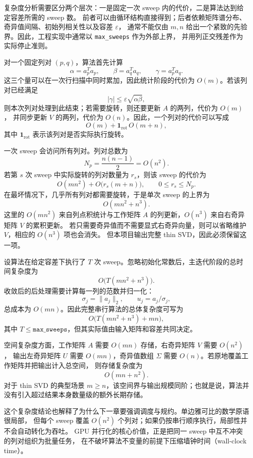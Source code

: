 复杂度分析需要区分两个层次：一是固定一次 sweep 内的代价，二是算法达到给定容差所需的 sweep 数。
前者可以由循环结构直接得到；后者依赖矩阵谱分布、奇异值间隔、初始列相关性以及容差 $\varepsilon$，
通常不能仅由 $m,n$ 给出一个紧致的先验界。因此，工程实现中通常以 \texttt{max\_sweeps} 作为外部上界，
并用列正交残差作为实际停止准则。

对一个固定列对 $(p,q)$，算法首先计算
\[
    \alpha=a_p^Ta_p,\qquad
    \beta=a_q^Ta_q,\qquad
    \gamma=a_p^Ta_q.
\]
这三个量可以在一次行扫描中同时累加，因此统计阶段的代价为 $O(m)$。若该列对已经满足
\[
    |\gamma|\le \varepsilon\sqrt{\alpha\beta},
\]
则本次列对处理到此结束；若需要旋转，则还要更新 $A$ 的两列，代价为 $O(m)$，
并同步更新 $V$ 的两列，代价为 $O(n)$。因此，一个列对的代价可以写成
\[
    O(m) + \mathbf{1}_{\mathrm{rot}}\,O(m+n),
\]
其中 $\mathbf{1}_{\mathrm{rot}}$ 表示该列对是否实际执行旋转。

一次 sweep 会访问所有列对。列对总数为
\[
    N_p=\frac{n(n-1)}{2}=O(n^2).
\]
若第 $s$ 次 sweep 中实际旋转的列对数量为 $r_s$，则该 sweep 的代价为
\[
    O(mn^2)+O\bigl(r_s(m+n)\bigr),
    \qquad 0\le r_s\le N_p.
\]
在最坏情况下，几乎所有列对都需要旋转，于是单次 sweep 的上界为
\[
    O(mn^2+n^3).
\]
这里的 $O(mn^2)$ 来自列点积统计与工作矩阵 $A$ 的列更新，$O(n^3)$ 来自右奇异矩阵 $V$ 的累积更新。
若只需要奇异值而不需要显式右奇异向量，则可以省略维护 $V$，相应的 $O(n^3)$ 项也会消失。
但本项目输出完整 thin SVD，因此必须保留这一项。

设算法在给定容差下执行了 $T$ 次 sweep。忽略初始化常数后，主迭代阶段的总时间复杂度为
\[
    O\bigl(T(mn^2+n^3)\bigr).
\]
收敛后的后处理需要计算每一列的范数并归一化：
\[
    \sigma_j=\|a_j\|_2,\qquad u_j=a_j/\sigma_j,
\]
总成本为 $O(mn)$。因此完整串行算法的总体复杂度可写为
\[
    O\bigl(T(mn^2+n^3)+mn\bigr),
\]
其中 $T\le \texttt{max\_sweeps}$，但其实际值由输入矩阵和容差共同决定。

空间复杂度方面，工作矩阵 $A$ 需要 $O(mn)$ 存储，右奇异矩阵 $V$ 需要 $O(n^2)$，
输出左奇异矩阵 $U$ 需要 $O(mn)$，奇异值数组 $\Sigma$ 需要 $O(n)$。若原地覆盖工作矩阵并把输出计入总空间，
则存储复杂度为
\[
    O(mn+n^2).
\]
对于 thin SVD 的典型场景 $m\ge n$，该空间界与输出规模同阶；也就是说，算法并没有引入超过结果本身数量级的额外长期存储。

这个复杂度结论也解释了为什么下一章要强调调度与规约。单边雅可比的数学原语很局部，
但每个 sweep 覆盖 $O(n^2)$ 个列对；如果仍按串行顺序执行，局部性并不会自动转化为吞吐。
GPU 并行化的核心价值，正是把同一 sweep 中互不冲突的列对组织为批量任务，
在不破坏算法不变量的前提下压缩墙钟时间（wall-clock time）。
